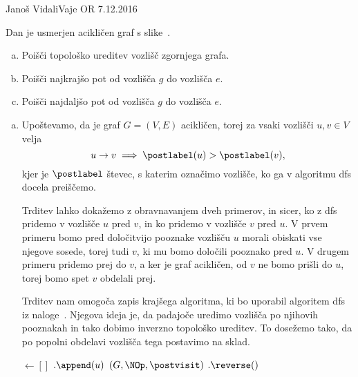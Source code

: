 \begin{naloga}{Janoš Vidali}{Vaje OR 7.12.2016}
\begin{vprasanje}
Dan je usmerjen acikličen graf s slike~\fig.

\begin{enumerate}[(a)]
\item Poišči topološko ureditev vozlišč zgornjega grafa.

\item Poišči najkrajšo pot od vozlišča $g$ do vozlišča $e$.

\item Poišči najdaljšo pot od vozlišča $g$ do vozlišča $e$.
\end{enumerate}

\begin{slika}
\pgfslika
{}
\end{slika}
\end{vprasanje}
\begin{odgovor}

\begin{enumerate}[(a)]
\item Upoštevamo, da je graf $G = (V, E)$ acikličen,
torej za vsaki vozlišči $u, v \in V$ velja
$$
u \rightarrow v \implies \postlabel(u) > \postlabel(v),
$$
kjer je $\postlabel$ števec, s katerim označimo vozlišče,
ko ga v algoritmu {\sc dfs} docela preiščemo.

Trditev lahko dokažemo z obravnavanjem dveh primerov, in sicer, 
ko z {\sc dfs} pridemo v vozlišče $u$ pred $v$,
in ko pridemo v vozlišče $v$ pred $u$.
V prvem primeru bomo pred določitvijo pooznake vozlišču $u$
morali obiskati vse njegove sosede,
torej tudi $v$, ki mu bomo določili pooznako pred $u$.
V drugem primeru pridemo prej do $v$,
a ker je graf acikličen, od $v$ ne bomo prišli do $u$,
torej bomo spet $v$ obdelali prej.

Trditev nam omogoča zapis krajšega algoritma,
ki bo uporabil algoritem {\sc dfs} iz naloge~\nal[dfs].
Njegova ideja je, da padajoče uredimo vozlišča po njihovih pooznakah
in tako dobimo inverzno topološko ureditev.
To dosežemo tako, da po popolni obdelavi vozlišča tega postavimo na sklad.

\begin{small}
\begin{algorithmic}
	 $\gets []$
		$.\append(u)$
	\EndFunction
	$(G, \NOp, \postvisit)$
	$.\reverse()$
	\State {}
\EndFunction
\end{algorithmic}
\end{small}


\end{enumerate}
\end{odgovor}
\end{naloga}
